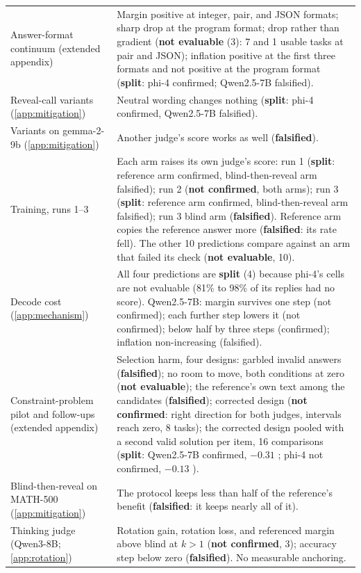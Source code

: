 {\begin{longtable}{L{3.5cm}L{9.5cm}}
Answer-format continuum (extended appendix) & Margin positive at integer, pair, and JSON formats; sharp drop at the program format; drop rather than gradient (\textbf{not evaluable} (3): 7 and 1 usable tasks at pair and JSON); inflation positive at the first three formats and not positive at the program format (\textbf{split}: phi-4 confirmed; Qwen2.5-7B falsified). \\
Reveal-call variants (\cref{app:mitigation}) & Neutral wording changes nothing (\textbf{split}: phi-4 confirmed, Qwen2.5-7B falsified). \\
Variants on gemma-2-9b (\cref{app:mitigation}) & Another judge's score works as well (\textbf{falsified}). \\
Training, runs 1--3 & Each arm raises its own judge's score: run 1 (\textbf{split}: reference arm confirmed, blind-then-reveal arm falsified); run 2 (\textbf{not confirmed}, both arms); run 3 (\textbf{split}: reference arm confirmed, blind-then-reveal arm falsified); run 3 blind arm (\textbf{falsified}). Reference arm copies the reference answer more (\textbf{falsified}: its rate fell). The other 10 predictions compare against an arm that failed its check (\textbf{not evaluable}, 10). \\
Decode cost (\cref{app:mechanism}) & All four predictions are \textbf{split} (4) because phi-4's cells are not evaluable (81\% to 98\% of its replies had no score). Qwen2.5-7B: margin survives one step (not confirmed); each further step lowers it (not confirmed); below half by three steps (confirmed); inflation non-increasing (falsified). \\
Constraint-problem pilot and follow-ups (extended appendix) & Selection harm, four designs: garbled invalid answers (\textbf{falsified}); no room to move, both conditions at zero (\textbf{not evaluable}); the reference's own text among the candidates (\textbf{falsified}); corrected design (\textbf{not confirmed}: right direction for both judges, intervals reach zero, 8 tasks); the corrected design pooled with a second valid solution per item, 16 comparisons (\textbf{split}: Qwen2.5-7B confirmed, $-0.31$ ; phi-4 not confirmed, $-0.13$ ). \\
Blind-then-reveal on MATH-500 (\cref{app:mitigation}) & The protocol keeps less than half of the reference's benefit (\textbf{falsified}: it keeps nearly all of it). \\
Thinking judge (Qwen3-8B; \cref{app:rotation}) & Rotation gain, rotation loss, and referenced margin above blind at $k{>}1$ (\textbf{not confirmed}, 3); accuracy step below zero (\textbf{falsified}). No measurable anchoring. \\

\end{longtable}}
